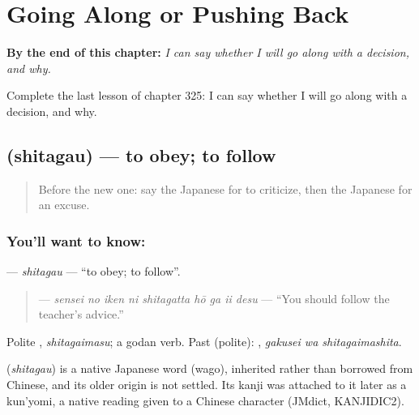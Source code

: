 
\chapter{Going Along or Pushing Back}
\label{ch:ja-going-along-or-pushing-back}

\begin{chapteropening}
\textbf{By the end of this chapter:} \emph{I can say whether I will go along with a decision, and why.}

Complete the last lesson of chapter 325: I can say whether I will go along with a decision, and why.
\end{chapteropening}

\section[\texorpdfstring{\ja{したがう} (shitagau)}{したがう (shitagau)}]{ (shitagau) — to obey; to follow}

\label{lesson:JA-C325-shitagau}



\begin{quote}
Before the new one: say the Japanese for to criticize, then the Japanese for an excuse.
\end{quote}

\subsection*{You'll want to know: }
\textbf{} — \emph{shitagau} — \textquotedblleft{}to obey; to follow\textquotedblright{}.

\begin{quote}
\textbf{    } — \emph{sensei no iken ni shitagatta hō ga ii desu} — \textquotedblleft{}You should follow the teacher's advice.\textquotedblright{}
\end{quote}

Polite \textbf{}, \emph{shitagaimasu}; a godan verb. Past (polite): \textbf{ }, \emph{gakusei wa shitagaimashita}.

\begin{cousinweb}
\textbf{} (\emph{shitagau}) is a native Japanese word (wago), inherited rather than borrowed from Chinese, and its older origin is not settled. Its kanji was attached to it later as a kun'yomi, a native reading given to a Chinese character (JMdict, KANJIDIC2).
\end{cousinweb}

